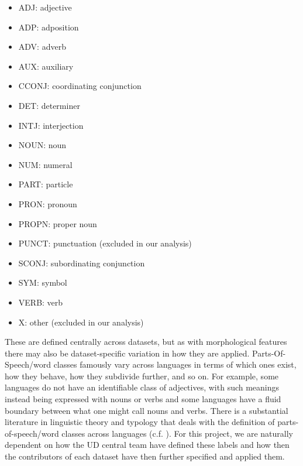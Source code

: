 \documentclass[USenglish]{article}
\begin{document}
\begin{itemize}
    \item ADJ: adjective
    \item ADP: adposition
    \item ADV: adverb
    \item AUX: auxiliary
    \item CCONJ: coordinating conjunction
    \item DET: determiner
    \item INTJ: interjection
    \item NOUN: noun
    \item NUM: numeral
    \item PART: particle
    \item PRON: pronoun
    \item PROPN: proper noun
    \item PUNCT: punctuation (excluded in our analysis)
    \item SCONJ: subordinating conjunction
    \item SYM: symbol
    \item VERB: verb
    \item X: other (excluded in our analysis)
\end{itemize}

These are defined centrally across datasets, but as with morphological features there may also be dataset-specific variation in how they are applied. 
Parts-Of-Speech/word classes famously vary across languages in terms of which ones exist, how they behave, how they subdivide further, and so on. 
For example, some languages do not have an identifiable class of adjectives, with such meanings instead being expressed with nouns or verbs and some languages have a fluid boundary between what one might call nouns and verbs. 
There is a substantial literature in linguistic theory and typology that deals with the definition of parts-of-speech/word classes across languages (c.f. \citet{davey_beyond_2024}).
For this project, we are naturally dependent on how the UD central team have defined these labels and how then the contributors of each dataset have then further specified and applied them.
\end{document}
